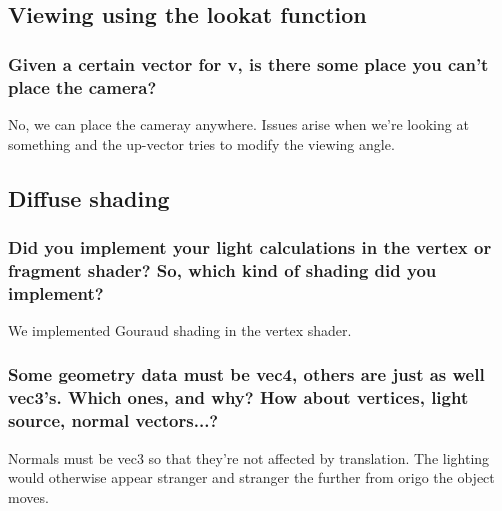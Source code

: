 \documentclass[a4paper,12pt]{article}
\begin{document}
\subsection{Viewing using the lookat function}
\subsubsection{Given a certain vector for v, is there some place you can't place the camera?}
No, we can place the cameray anywhere. Issues arise when we're looking at something and the up-vector tries to modify the viewing angle.

\subsection{Diffuse shading}
\subsubsection{Did you implement your light calculations in the vertex or fragment shader? So, which kind of shading did you implement?}
We implemented Gouraud shading in the vertex shader.

\subsubsection{Some geometry data must be vec4, others are just as well vec3's. Which ones, and why? How about vertices, light source, normal vectors...?}
Normals must be vec3 so that they're not affected by translation. The lighting would otherwise appear stranger and stranger the further from origo the object moves.
\end{document}
